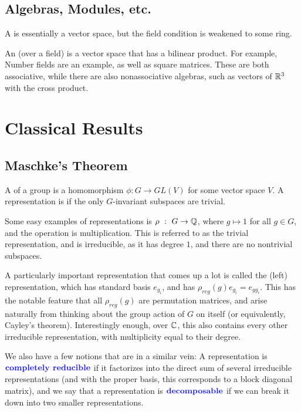 \documentclass{article}
\begin{document}
\subsection{Algebras, Modules, etc.}
A  is essentially a vector space, but the field condition is weakened to some ring.

An  (over a field) is a vector space that has a bilinear product. For example, Number fields are an example, as well as square matrices. These are both associative, while there are also nonassociative algebras, such as vectors of $\mathbb R^3$ with the cross product.

\section{Classical Results}
\subsection{Maschke's Theorem}
\begin{definition}
A  of a group is a homomorphism $\phi : G \to GL(V)$ for some vector space $V$. A representation is  if the only $G$-invariant subspaces are trivial.
\end{definition}

Some easy examples of representations is $\rho \ : \ G \to \mathbb Q$, where $g \mapsto 1$ for all $g \in G$, and the operation is multiplication. This is referred to as the trivial representation, and is irreducible, as it has degree $1$, and there are no nontrivial subspaces.

A particularly important representation that comes up a lot is called the (left)  representation, which has standard basis $e_{g_i}$, and has $\rho_{reg}(g) e_{g_i} = e_{gg_i}$. This has the notable feature that all  $\rho_{reg} (g)$ are permutation matrices, and arise naturally from thinking about the group action of $G$ on itself (or equivalently, Cayley's theorem). Interestingly enough, over $\mathbb C$, this also contains every other irreducible representation, with multiplicity equal to their degree.

We also have a few notions that are in a similar vein: A representation is $\vocab{completely reducible}$ if it factorizes into the direct sum of several irreducible representations (and with the proper basis, this corresponds to a block diagonal matrix), and we say that a representation is $\vocab{decomposable}$ if we can break it down into two smaller representations.
\end{document}
